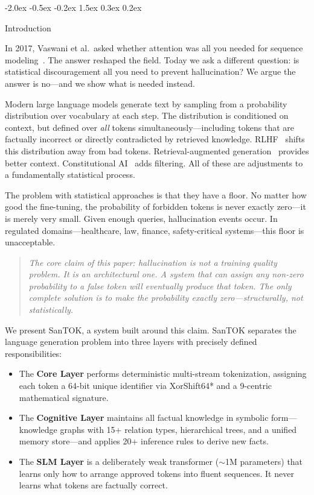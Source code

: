 \documentclass[10pt]{article}
\makeatletter
\renewcommand{\section}{\@startsection{section}{1}{\z@}%
  {-2.0ex \@plus -0.5ex \@minus -0.2ex}%
  {1.5ex \@plus 0.3ex \@minus 0.2ex}%
  {\large\bfseries\raggedright}}
\makeatother
\begin{document}
\section{Introduction}

In 2017, Vaswani et al.\ asked whether attention was all you needed for sequence
modeling~\cite{vaswani2017attention}. The answer reshaped the field. Today we ask a
different question: is statistical discouragement all you need to prevent hallucination?
We argue the answer is no---and we show what is needed instead.

Modern large language models generate text by sampling from a probability distribution
over vocabulary at each step. The distribution is conditioned on context, but defined
over \emph{all} tokens simultaneously---including tokens that are factually incorrect
or directly contradicted by retrieved knowledge. RLHF~\cite{ouyang2022training} shifts
this distribution away from bad tokens. Retrieval-augmented
generation~\cite{lewis2020rag} provides better context. Constitutional
AI~\cite{bai2022constitutional} adds filtering. All of these are adjustments to a
fundamentally statistical process.

The problem with statistical approaches is that they have a floor. No matter how good
the fine-tuning, the probability of forbidden tokens is never exactly
zero---it is merely very small. Given enough queries, hallucination events occur. In
regulated domains---healthcare, law, finance, safety-critical systems---this floor is
unacceptable.

\begin{quote}
\textit{The core claim of this paper: hallucination is not a training quality problem.
It is an architectural one. A system that can assign any non-zero probability to a
false token will eventually produce that token. The only complete solution is to make
the probability exactly zero---structurally, not statistically.}
\end{quote}

We present SanTOK, a system built around this claim. SanTOK separates the language
generation problem into three layers with precisely defined responsibilities:

\begin{itemize}
  \item The \textbf{Core Layer} performs deterministic multi-stream tokenization,
        assigning each token a 64-bit unique identifier via XorShift64* and a
        9-centric mathematical signature.
  \item The \textbf{Cognitive Layer} maintains all factual knowledge in symbolic
        form---knowledge graphs with 15+ relation types, hierarchical trees, and a
        unified memory store---and applies 20+ inference rules to derive new facts.
  \item The \textbf{SLM Layer} is a deliberately weak transformer ($\sim$1M parameters)
        that learns only how to arrange approved tokens into fluent sequences.
        It never learns what tokens are factually correct.
\end{itemize}
\end{document}
